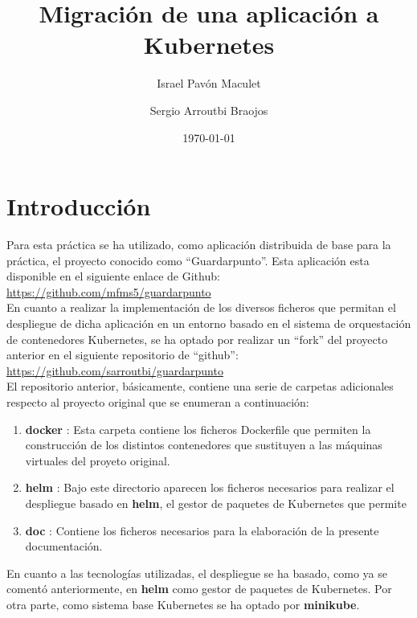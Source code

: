\documentclass[12pt,spanish]{article}
\title{\textbf{Migración de una aplicación a Kubernetes}}
\author{Israel Pavón Maculet\\
  \and
  Sergio Arroutbi Braojos}
\date{\today}
\begin{document}
\maketitle
\hypersetup{linkcolor=black,urlcolor=blue}
\tableofcontents

\listoffigures

\pagebreak
\section{Introducción}

Para esta práctica se ha utilizado, como aplicación distribuida de base para la práctica, el proyecto conocido como ``Guardarpunto''. Esta aplicación esta disponible en el siguiente enlace de Github:\\

\url{https://github.com/mfms5/guardarpunto}\\

En cuanto a realizar la implementación de los diversos ficheros que permitan el despliegue de dicha aplicación en un entorno basado en el sistema de orquestación de contenedores Kubernetes, se ha optado por realizar un ``fork'' del proyecto anterior en el siguiente repositorio de ``github'':\\

\url{https://github.com/sarroutbi/guardarpunto}\\

El repositorio anterior, básicamente, contiene una serie de carpetas adicionales respecto al proyecto original que se enumeran a continuación:

\begin{enumerate}
\item{\textbf{docker} :} Esta carpeta contiene los ficheros Dockerfile que permiten la construcción de los distintos contenedores que sustituyen a las máquinas virtuales del proyeto original.
\item{\textbf{helm} :} Bajo este directorio aparecen los ficheros necesarios para realizar el despliegue basado en \textbf{helm}, el gestor de paquetes de Kubernetes que permite
\item{\textbf{doc} :} Contiene los ficheros necesarios para la elaboración de la presente documentación.
\end{enumerate}

En cuanto a las tecnologías utilizadas, el despliegue se ha basado, como ya se comentó anteriormente, en \textbf{helm} como gestor de paquetes de Kubernetes. Por otra parte, como sistema base Kubernetes se ha optado por \textbf{minikube}.\\
\end{document}
